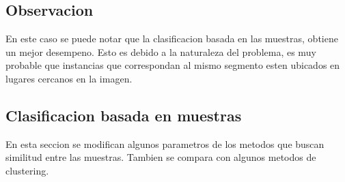 \documentclass[a4paper]{article}
\begin{document}
\subsection{Observacion}

En este caso se puede notar que la clasificacion basada
en las muestras, obtiene un mejor desempeno. Esto es debido
a la naturaleza del problema, es muy probable que
instancias que correspondan al mismo segmento esten ubicados
en lugares cercanos en la imagen.

\subsection{Clasificacion basada en muestras}

En esta seccion se modifican algunos parametros de los metodos
que buscan similitud entre las muestras. Tambien se compara
con algunos metodos de clustering.
\end{document}
